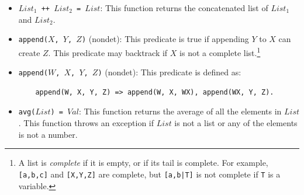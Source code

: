 \begin{itemize}
\item \texttt{$List_1$ ++ $List_2$ = $List$}: This function returns the concatenated list of $List_1$ and $List_2$. 
\item \texttt{append($X$, $Y$, $Z$)} (nondet): This predicate is true if appending $Y$ to $X$ can create $Z$. This predicate may backtrack if $X$ is not a complete list.\footnote{A list is \emph{complete}  if it is empty, or if its tail is complete. For example, \texttt{[a,b,c]} and \texttt{[X,Y,Z]} are complete, but \texttt{[a,b|T]} is not complete if \texttt{T} is a variable.}

\item \texttt{append($W$, $X$, $Y$, $Z$)} (nondet): This predicate is defined as:
\begin{verbatim}
    append(W, X, Y, Z) => append(W, X, WX), append(WX, Y, Z).
\end{verbatim}

\item \texttt{avg($List$) = $Val$}: This function returns the average of all the elements in $List$. This function throws an exception if $List$ is not a list or any of the elements is not a number. 


\end{itemize}
